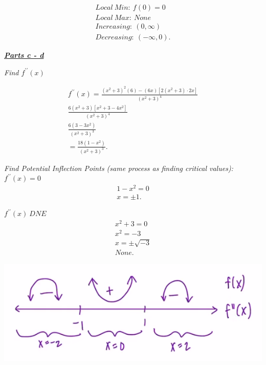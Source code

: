 \documentclass{report}
\begin{document}
  \bigbreak \noindent 

  \begin{align*}
    Local\ Min:\ f(0) = 0 \\
    Local\ Max:\ None \\
    Increasing:\ (0,\infty) \\
    Decreasing:\ (-\infty, 0)
  .\end{align*}
  \bigbreak \noindent 

  \bigbreak \noindent 
  \begin{center}
    \textbf{\textit{\underline{Parts c - d}}}
  \end{center}

  \bigbreak \noindent 
  \textit{Find $f^{\prime\prime}(x)$}

  \begin{align*}
    f^{\prime\prime}(x) = \frac{(x^{2}+3)^{2}(6) - (6x)[2(x^{2}+3) \cdot 2x]}{(x^{2}+3)^{4}} \\
    \frac{6(x^{2}+3)[x^{2}+3 - 4x^{2}]}{(x^{2}+3)^{4}} \\
    \frac{6(3-3x^{2})}{(x^{2}+3)^{3}} \\
    = \frac{18(1-x^{2})}{(x^{2}+3)^{3}}
  .\end{align*}

  \bigbreak \noindent 
  \textit{Find Potential Inflection Points (same process as finding critical values):}
  \bigbreak \noindent 
  $f^{\prime\prime}(x) = 0$
  \begin{align*}
    1-x^{2} = 0 \\
    \boxed{x = \pm 1}
  .\end{align*}

  \bigbreak \noindent 
  $f^{\prime\prime}(x)\ DNE$
  \begin{align*}
    x^{2} + 3 = 0 \\
    x^{2} = -3 \\
    x = \pm \sqrt{-3} \\
    \boxed{None}
  .\end{align*}

  \bigbreak \noindent 
  \begin{center}
    \includegraphics[scale=0.8]{ ./images/5.png }
  \end{center}
\end{document}
